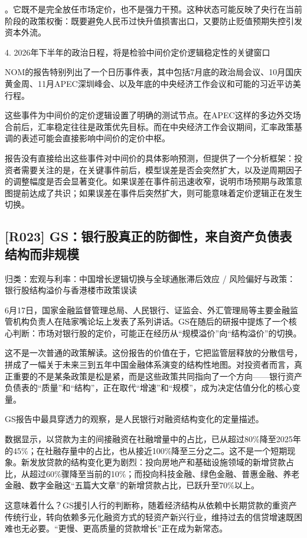 \documentclass[11pt]{ctexart}
\begin{document}
。它既不是完全放任市场定价，也不是强力干预。这种状态可能反映了央行在当前阶段的政策权衡：既要避免人民币过快升值损害出口，又要防止贬值预期失控引发资本外流。

4. 2026年下半年的政治日程，将是检验中间价定价逻辑稳定性的关键窗口

NOM的报告特别列出了一个日历事件表，其中包括7月底的政治局会议、10月国庆黄金周、11月APEC深圳峰会、以及年底的中央经济工作会议和可能的习近平访美行程。

这些事件为中间价的定价逻辑设置了明确的测试节点。在APEC这样的多边外交场合前后，汇率稳定往往是政策优先目标。而在中央经济工作会议期间，汇率政策基调的表述可能会直接影响中间价的定价中枢。

报告没有直接给出这些事件对中间价的具体影响预测，但提供了一个分析框架：投资者需要关注的是，在关键事件前后，模型误差是否会突然扩大，以及逆周期因子的调整幅度是否会显著变化。如果误差在事件前迅速收窄，说明市场预期与政策意图提前达成了共识；如果误差在事件后突然扩大，则可能意味着定价逻辑正在发生切换。

\subsection{[R023] GS：银行股真正的防御性，来自资产负债表结构而非规模}
{\small\color{refgray}归类：宏观与利率：中国增长逻辑切换与全球通胀滞后效应 / 风险偏好与政策：银行股结构溢价与香港楼市政策误读}

6月17日，国家金融监督管理总局、人民银行、证监会、外汇管理局等主要金融监管机构负责人在陆家嘴论坛上发表了系列讲话。GS在随后的研报中提炼了一个核心判断：市场对银行股的定价，可能正在经历从“规模溢价”向“结构溢价”的切换。

这不是一次普通的政策解读。这份报告的价值在于，它把监管层释放的分散信号，拼成了一幅关于未来三到五年中国金融体系演变的结构性地图。对投资者而言，真正重要的不是某条政策是松是紧，而是这些政策共同指向了一个方向——银行资产负债表的“质量”和“结构”，正在取代“增速”和“规模”，成为决定估值分化的核心变量。

GS报告中最具穿透力的观察，是人民银行对融资结构变化的定量描述。

数据显示，以贷款为主的间接融资在社融增量中的占比，已从超过80\%降至2025年的45\%；在社融存量中的占比，也从接近100\%降至三分之二。这不是一个短期现象。新发放贷款的结构变化更为剧烈：投向房地产和基础设施领域的新增贷款占比，从超过60\%骤降至当前的10\%；而投向科技金融、绿色金融、普惠金融、养老金融、数字金融这“五篇大文章”的新增贷款占比，已跃升至70\%以上。

这意味着什么？GS援引人行的判断称，随着经济结构从依赖中长期贷款的重资产传统行业，转向依赖多元化融资方式的轻资产新兴行业，维持过去的信贷增速既困难也无必要。“更慢、更高质量的贷款增长”正在成为新常态。
\end{document}

